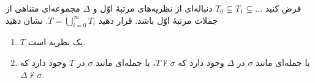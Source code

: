 فرض کنید $T_0 \varsubsetneq T_1 \varsubsetneq \dots$ دنباله‌ای از نظریه‌های مرتبهٔ اوّل و $\Delta$ مجموعه‌ای متناهی از جملات مرتبهٔ اوّل باشد. قرار دهید $T = \bigcup_{i=0}^\infty T_i$. نشان دهید
\begin{enumerate}[label=(\alph*)]
  \item $T$ یک نظریه است.
  ~
  \item یا جمله‌ای مانند $\sigma$ در $\Delta$ وجود دارد که $T \not\vdash \sigma$، یا جمله‌ای مانند $\sigma$ در $T$ وجود دارد که $\Delta \not\vdash \sigma$.
  ~
\end{enumerate}